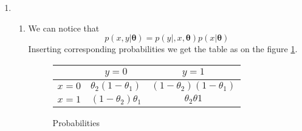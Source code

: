 \documentclass[10pt,a4paper]{article}
\begin{document}
\begin{enumerate}
\begin{enumerate}
\begin{align}
 +\transpose{\left(\expectation \left[ \hat{\textbf{w}}(\mathcal{D}) \right]\right)} 
 \expectation \left[ \hat{\textbf{w}}(\mathcal{D}) \right] 
 \right] \label{eq:dis3}\\
 &=  \expectation \left[ \transpose{(\hat{\textbf{w}}(\mathcal{D}))}
 \hat{\textbf{w}}(\mathcal{D})
 \right]
 -\transpose{\left(\expectation \left[ \hat{\textbf{w}}(\mathcal{D}) \right]\right)}
 \expectation \left[ \hat{\textbf{w}}(\mathcal{D}) \right]-
 \nonumber \\
 &-\expectation \left[ \transpose{(\hat{\textbf{w}}(\mathcal{D}))} \right]
 \expectation \left[ \hat{\textbf{w}}(\mathcal{D}) \right] 
 +\transpose{\left(\expectation \left[ \hat{\textbf{w}}(\mathcal{D}) \right]\right)} 
 \expectation \left[ \hat{\textbf{w}}(\mathcal{D}) \right] 
\label{eq:prop3} \\ 
 &=\expectation \left[ \transpose{(\hat{\textbf{w}}(\mathcal{D}))}
 \hat{\textbf{w}}(\mathcal{D})
 \right]
 -\transpose{\left(\expectation \left[ \hat{\textbf{w}}(\mathcal{D}) \right]\right)} 
 \expectation \left[ \hat{\textbf{w}}(\mathcal{D}) \right]
 \label{eq:last3}
\end{align}

The equation \ref{eq:product3} is the other way to calculate Eucleadean norm using scalar product. The equation \ref{eq:dis3} is simple distributivity law.  The equation \ref{eq:prop3} uses properties of mathematical expectation. The last equation \ref{eq:last3} uses only a property that a scalar product of a column and a row vector is equal to their transposed product. 
\\
By adding equations \ref{eq:last2} and \ref{eq:last3} we get the expression from the equation \ref{eq:last}.
\end{enumerate}
\item
\begin{enumerate}
\item[1.]
We can notice that $$p(x, y \vert \mathbf{\theta})=p (y\vert, x, \mathbf{\theta})p(x|\mathbf{\theta})$$
Inserting corresponding probabilities we get the table as on the figure \ref{fig:Prob}.

\begin{figure}[htb!]
\begin{center}
\begin{tabular}{c|cc}
 & $y=0$ & $y=1$ \\ 
\hline 
$x=0$ & $\theta_2(1-\theta_1)$ & $(1-\theta_2)(1-\theta_1)$ \\ 
$x=1$ & $(1-\theta_2)\theta_1$ & $\theta_2\theta1$ \\ 
\end{tabular} 
\end{center}
\caption{Probabilities}
\label{fig:Prob}
\end{figure}


\end{enumerate}
\end{enumerate}
\end{document}
